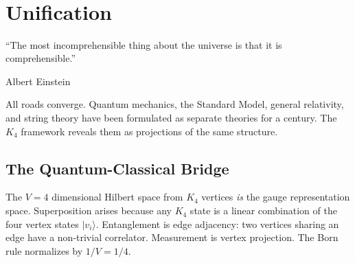 \documentclass[11pt,a4paper]{book}
\begin{document}
\begin{code}
\\
%
\>[2]\AgdaSymbol{;}\AgdaSpace{}%
%
\>[26]\AgdaSymbol{=}\AgdaSpace{}%
\<%
\\
%
\>[2]\AgdaSymbol{;}\AgdaSpace{}%
%
\>[26]\AgdaSymbol{=}\AgdaSpace{}%
\<%
\\
%
\>[2]\AgdaSymbol{;}\AgdaSpace{}%
%
\>[26]\AgdaSymbol{=}\AgdaSpace{}%
\<%
\\
%
\>[2]\AgdaSymbol{;}\AgdaSpace{}%
%
\>[26]\AgdaSymbol{=}\AgdaSpace{}%
\<%
\\
%
\>[2]\AgdaSymbol{;}\AgdaSpace{}%
%
\>[26]\AgdaSymbol{=}\AgdaSpace{}%
\<%
\\
%
\>[2]\AgdaSymbol{;}\AgdaSpace{}%
%
\>[26]\AgdaSymbol{=}\AgdaSpace{}%
\AgdaSpace{}%
\AgdaSymbol{\}}\<%
\end{code}

\chapter{Unification}
\label{ch:unification}

\epigraph{``The most incomprehensible thing about the universe is that it is comprehensible.''}{Albert Einstein}

All roads converge. Quantum mechanics, the Standard Model, general relativity, and string theory have been formulated as separate theories for a century. The $K_4$ framework reveals them as projections of the same structure.

\section{The Quantum-Classical Bridge}
\label{sec:qm-sm-bridge}

The $V = 4$ dimensional Hilbert space from $K_4$ vertices \emph{is} the gauge representation space. Superposition arises because any $K_4$ state is a linear combination of the four vertex states $|v_i\rangle$. Entanglement is edge adjacency: two vertices sharing an edge have a non-trivial correlator. Measurement is vertex projection. The Born rule normalizes by $1/V = 1/4$.
\end{document}

